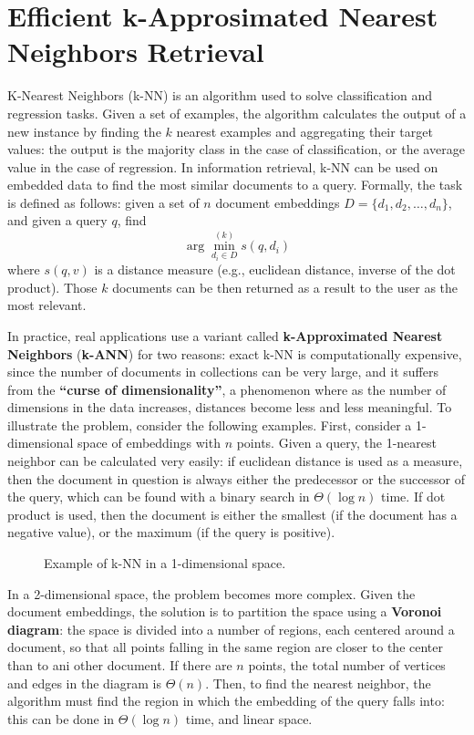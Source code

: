 \chapter{Efficient k-Approsimated Nearest Neighbors Retrieval}

K-Nearest Neighbors (k-NN) is an algorithm used to solve classification and regression tasks. Given a set of examples, the algorithm calculates the output of a new instance by finding the $k$ nearest examples and aggregating their target values: the output is the majority class in the case of classification, or the average value in the case of regression. In information retrieval, k-NN can be used on embedded data to find the most similar documents to a query. Formally, the task is defined as follows: given a set of $n$ document embeddings $D = \{d_1, d_2, \dots,d_n\}$, and given a query $q$, find
\begin{equation*}
    \arg\min_{d_i \in D}^{(k)} s(q, d_i) 
\end{equation*}
where $s(q,v)$ is a distance measure (e.g., euclidean distance, inverse of the dot product). Those $k$ documents can be then returned as a result to the user as the most relevant.

\sloppy
In practice, real applications use a variant called \textbf{k-Approximated Nearest Neighbors} (\textbf{k-ANN}) for two reasons: exact k-NN is computationally expensive, since the number of documents in collections can be very large, and it suffers from the \textbf{``curse of dimensionality''}, a phenomenon where as the number of dimensions in the data increases, distances become less and less meaningful. To illustrate the problem, consider the following examples. First, consider a 1-dimensional space of embeddings with $n$ points. Given a query, the 1-nearest neighbor can be calculated very easily: if euclidean distance is used as a measure, then the document in question is always either the predecessor or the successor of the query, which can be found with a binary search in $\Theta(\log n)$ time. If dot product is used, then the document is either the smallest (if the document has a negative value), or the maximum (if the query is positive).
\clearpage
\begin{figure}[t]
    \centering
    
    \caption{Example of k-NN in a 1-dimensional space.}
\end{figure}
\fussy
In a 2-dimensional space, the problem becomes more complex. Given the document embeddings, the solution is to partition the space using a \textbf{Voronoi diagram}: the space is divided into a number of regions, each centered around a document, so that all points falling in the same region are closer to the center than to ani other document. If there are $n$ points, the total number of vertices and edges in the diagram is $\Theta(n)$. Then, to find the nearest neighbor, the algorithm must find the region in which the embedding of the query falls into: this can be done in $\Theta(\log n)$ time, and linear space.

